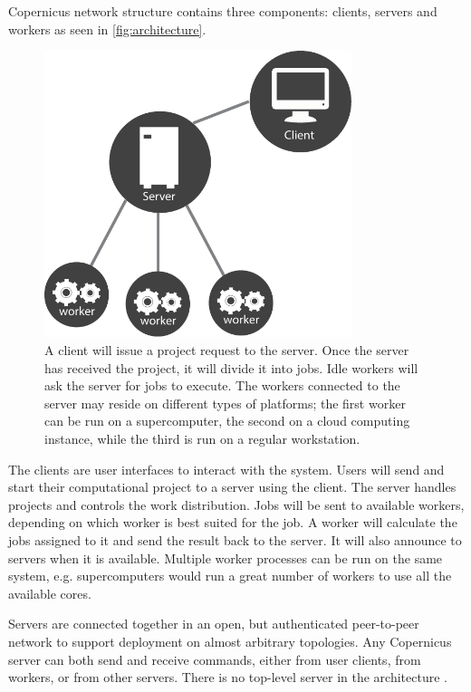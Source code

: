 Copernicus network structure contains three components: clients,
servers and workers as seen in \autoref{fig:architecture}.

\begin{figure}[H]
  \centering
  \includegraphics[width=0.8\textwidth]{gfx/architecture.pdf}
  \caption{A client will issue a project request to the server. Once
    the server has received the project, it will divide it into
    jobs. Idle workers will ask the server for jobs to execute. The
    workers connected to the server may reside on different types of
    platforms; the first worker can be run on a supercomputer, the
    second on a cloud computing instance, while the third is run on a
    regular workstation.}
  \label{fig:architecture}
\end{figure}

The clients are user interfaces to interact with the system. Users
will send and start their computational project to a server using the
client. The server handles projects and controls the work
distribution. Jobs will be sent to available workers, depending on
which worker is best suited for the job. A worker will calculate the
jobs assigned to it and send the result back to the server. It will
also announce to servers when it is available. Multiple worker
processes can be run on the same system, e.g. supercomputers would run
a great number of workers to use all the available cores.

Servers are connected together in an open, but authenticated
peer-to-peer network to support deployment on almost arbitrary
topologies. Any Copernicus server can both send and receive commands,
either from user clients, from workers, or from other servers. There
is no top-level server in the architecture \citep{pronk:2011}.


